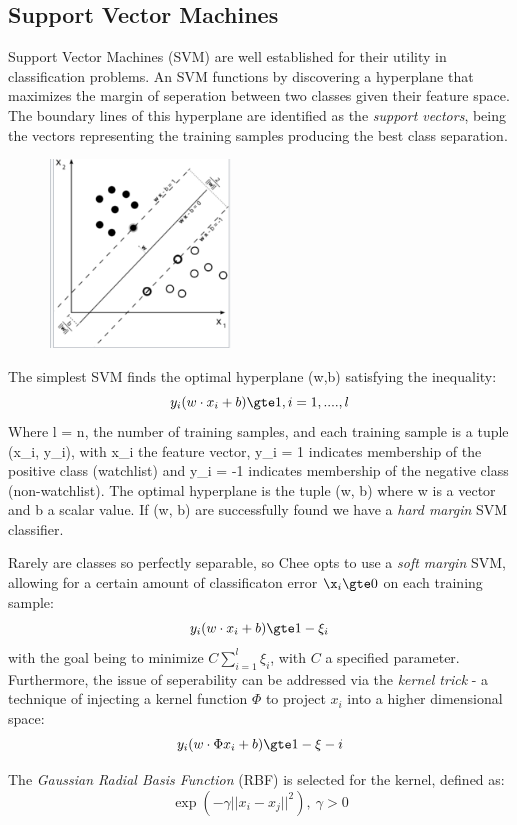 \documentclass[twoside,11pt]{article}
\begin{document}
\subsection{Support Vector Machines}
Support Vector Machines (SVM) \citep{Cortes, Vapnik} are well established for their utility in classification problems. An SVM functions by discovering a hyperplane that maximizes the margin of seperation between two classes given their feature space. The boundary lines of this hyperplane are identified as the \textit{support vectors}, being the vectors representing the training samples producing the best class separation.

\includegraphics[width=7cm, height=5cm]{SVM.png}

The simplest SVM finds the optimal hyperplane (w,b) satisfying the inequality:
\[
  y_{i}(w \cdot x_{i} + b) \gte 1,  i = 1, ...., l
\]
Where l = n, the number of training samples, and each training sample is a tuple (x_{i}, y_{i}), with x_{i} the feature vector, y_{i} = 1 indicates membership of the positive class (watchlist) and y_{i} = -1 indicates membership of the negative class (non-watchlist). The optimal hyperplane is the tuple (w, b) where w is a vector and b a scalar value.  If (w, b) are successfully found we have a \textit{hard margin} SVM classifier.

Rarely are classes so perfectly separable, so Chee opts to use a \textit{soft margin} SVM, allowing for a certain amount of classificaton error $\x_{i} \gte 0$ on each training sample:
\[
  y_{i}(w \cdot x_{i} + b) \gte 1 - \xi_{i}
\]
with the goal being to minimize $C\sum_{i=1}^{l} \xi_{i}$, with $C$ a specified parameter. Furthermore, the issue of seperability can be addressed via the \textit{kernel trick} - a technique of injecting a kernel function $\Phi$ to project $x_{i}$ into a higher dimensional space:
\[
  y_{i}(w \cdot \Phi{x_{i}} + b) \gte 1 - \xi-{i}
\]

The \textit{Gaussian Radial Basis Function} (RBF) is selected for the kernel, defined as:
\[
  \exp(-\gamma||x_{i} - x_{j}||^{2}),\ \gamma > 0
\]
\end{document}
